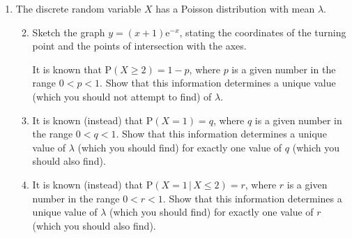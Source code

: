 \documentclass[a4, 11pt]{report}
\newlength{\qspace}
\newcounter{qnumber}
\newenvironment{question}%
 {\vspace{\qspace}
  \begin{enumerate}[\bfseries 1\quad][10]%
    \setcounter{enumi}{\value{qnumber}}%
    \item%
 }
{
  \end{enumerate}
  \filbreak
  \stepcounter{qnumber}
 }
\newenvironment{questionparts}[1][1]%
 {
  \begin{enumerate}[\bfseries (i)]%
    \setcounter{enumii}{#1}
    \addtocounter{enumii}{-1}
    \setlength{\itemsep}{5mm}
    \setlength{\parskip}{8pt}
 }
 {
  \end{enumerate}
 }
\def\e{{\mathrm e}}
\def\P{{\mathrm P}}
\def\le{\leqslant}
\def\ge{\geqslant}
\def\l{\left(}
\def\r{\right)}
\begin{document}
\begin{question}
The discrete random variable $X$
has a Poisson distribution with mean $\lambda$.

\begin{questionparts}
\item Sketch the graph $y=\l x+1 \r \e^{-x}$,
stating the coordinates of the turning point
and the points of intersection with the axes. 

It is known that $\P(X \ge 2) = 1-p$,
where $p$ is a given number in the range $0 < p <1$.
Show that this information determines a unique value
(which you should not attempt to find) of $\lambda$.

\item  It is known (instead) that $\P \l X = 1 \r = q$,
where $q$ is a given number in the range $0 < q <1$.
Show that this information determines a unique value of
$\lambda$ (which you should find) for exactly
one value of $q$ (which you should also find).

\item It is known (instead) that 
$\P \l X = 1 \, \vert \, X \le 2 \r =  r$,
where $r$ is a given number in the range $0<r<1$.
 Show that this information determines a unique value of
$\lambda$ (which you should find) for exactly
one value of $r$ (which you should also find).
\end{questionparts}
\end{question}
	
\end{document}
